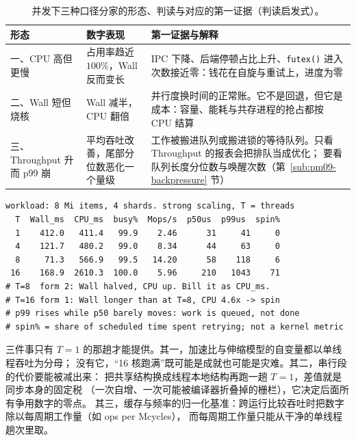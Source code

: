 \documentclass[12pt,a4paper,fontset=fandol]{ctexbook}
\newcommand{\Fn}[1]{\texttt{#1()}}
\newcommand{\Lang}[1]{\textsf{#1}}
\newcommand{\MWall}{\Lang{Wall}}
\newcommand{\MCpu}{\Lang{CPU}}
\newcommand{\MThr}{\Lang{Throughput}}
\newcommand{\Mx}[1]{\textsf{#1}}
\begin{document}
\begin{table}[htbp]
\centering
\small
\begin{tabular}{>{\raggedright\arraybackslash}p{}
                >{\raggedright\arraybackslash}p{}
                >{\raggedright\arraybackslash}p{}}
\toprule
形态 & 数字表现 & 第一证据与解释 \\
\midrule
一、\MCpu{} 高但更慢 & 占用率趋近 $100\%$，\MWall{} 反而变长 &
  \Mx{IPC} 下降、后端停顿占比上升、\Fn{futex} 进入次数接近零：钱花在自旋与重试上，进度为零 \\[3pt]
二、\MWall{} 短但烧核 & \MWall{} 减半，\MCpu{} 翻倍 &
  并行度换时间的正常账。它不是回退，但它是成本：容量、能耗与共存进程的抢占都按 \MCpu{} 结算 \\[3pt]
三、\MThr{} 升而 \Mx{p99} 崩 & 平均吞吐改善，尾部分位数恶化一个量级 &
  工作被搬进队列或搬进锁的等待队列。只看 \MThr{} 的报表会把排队当成优化；
  要看队列长度分位数与唤醒次数（第~\ref{sub:pm09-backpressure} 节） \\
\bottomrule
\end{tabular}
\caption{并发下三种口径分家的形态、判读与对应的第一证据（判读启发式）。}
\label{tab:pm09-forms}
\end{table}

\begin{lstlisting}[style=outstyle, label={lst:pm09-forms},
caption={同一负载扫四档线程数的示意输出与格式示例（非本仓库实测值）。}]
workload: 8 Mi items, 4 shards. strong scaling, T = threads
  T  Wall_ms  CPU_ms  busy%  Mops/s  p50us  p99us  spin%
  1    412.0   411.4   99.9    2.46      31     41     0
  4    121.7   480.2   99.0    8.34      44     63     0
  8     71.3   566.9   99.5   14.20      58    118     6
 16    168.9  2610.3  100.0    5.96     210   1043    71
# T=8  form 2: Wall halved, CPU up. Bill it as CPU_ms.
# T=16 form 1: Wall longer than at T=8, CPU 4.6x -> spin
# p99 rises while p50 barely moves: work is queued, not done
# spin% = share of scheduled time spent retrying; not a kernel metric
\end{lstlisting}

\begin{note}[title={为什么单线程基线在并发章里仍然必需}]
三件事只有 $T=1$ 的那趟才能提供。其一，加速比与伸缩模型的自变量都以单线程吞吐为分母；
没有它，``16 核跑满''既可能是成就也可能是灾难。其二，串行段的代价要能被减出来：
把共享结构换成线程本地结构再跑一趟 $T=1$，差值就是同步本身的固定税
（一次自增、一次可能被编译器折叠掉的栅栏），它决定后面所有争用数字的零点。
其三，缓存与频率的归一化基准：跨运行比较吞吐时把数字除以每周期工作量（如 ops per Mcycles），
而每周期工作量只能从干净的单线程趟次里取。
\end{note}
\end{document}
